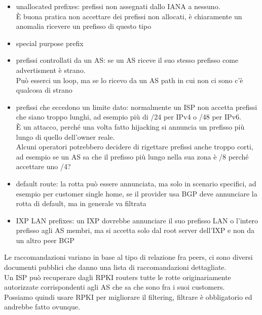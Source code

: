 \documentclass[12pt, oneside]{extbook} %
\begin{document}
\begin{itemize}
	\item unallocated prefixes: prefissi non assegnati dallo IANA a nessuno.
    \\È buona pratica non accettare dei prefissi non allocati, è chiaramente un anomalia ricevere un prefisso di questo tipo
	\item special purpose prefix 
	\item prefissi controllati da un AS: se un AS riceve il suo stesso prefisso come advertisment è strano.
    \\Può esserci un loop, ma se lo ricevo da un AS path in cui non ci sono c'è qualcosa di strano
	\item prefissi che eccedono un limite dato: normalmente un ISP non accetta prefissi che siano troppo lunghi, ad esempio più di /24 per IPv4 o /48 per IPv6.
    \\È un attacco, perché una volta fatto hijacking si annuncia un prefisso più lungo di quello dell'owner reale.
    \\Alcuni operatori potrebbero decidere di rigettare prefissi anche troppo corti, ad esempio se un AS sa che il prefisso più lungo nella sua zona è /8 perché accettare uno /4?
	\item default route: la rotta può essere annunciata, ma solo in scenario specifici, ad esempio per customer single home, se il provider usa BGP deve annunciare la rotta di default, ma in generale va filtrata
	\item IXP LAN prefixes: un IXP dovrebbe annunciare il suo prefisso LAN o l'intero prefisso agli AS membri, ma si accetta solo dal root server dell'IXP e non da un altro peer BGP
\end{itemize}
Le raccomandazioni variano in base al tipo di relazione fra peers, ci sono diversi documenti pubblici che danno una lista di raccomandazioni dettagliate.
\\Un ISP può recuperare dagli RPKI routers tutte le rotte originariamente autorizzate corrispondenti agli AS che sa che sono fra i suoi customers.
\\Possiamo quindi usare RPKI per migliorare il filtering, filtrare è obbligatorio ed andrebbe fatto ovunque.
\end{document}
